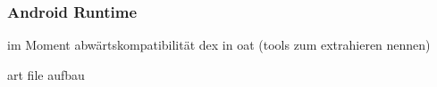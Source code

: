 \subsubsection{Android Runtime} \label{subsubsection:android-evolution-art}
im Moment abwärtskompatibilität dex in oat (tools zum extrahieren nennen)


art file aufbau\newline
